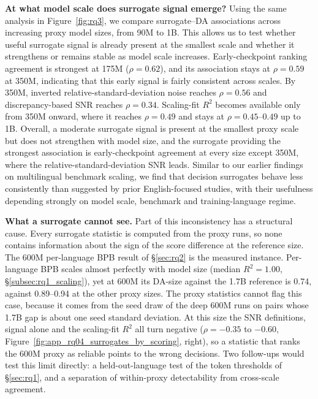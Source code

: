 \textbf{At what model scale does surrogate signal emerge?}
Using the same analysis in Figure~\ref{fig:rq3}, we compare surrogate--DA associations across increasing proxy model sizes, from 90M to 1B.
This allows us to test whether useful surrogate signal is already present at the smallest scale and whether it strengthens or remains stable as model scale increases.
Early-checkpoint ranking agreement is strongest at 175M ($\rho=0.62$), and its association stays at $\rho=0.59$ at 350M, indicating that this early signal is fairly consistent across scales.
By 350M, inverted relative-standard-deviation noise reaches $\rho=0.56$ and discrepancy-based SNR reaches $\rho=0.34$.
Scaling-fit $R^2$ becomes available only from 350M onward, where it reaches $\rho=0.49$ and stays at $\rho = 0.45$--$0.49$ up to 1B.
Overall, a moderate surrogate signal is present at the smallest proxy scale but does not strengthen with model size, and the surrogate providing the strongest association is early-checkpoint agreement at every size except 350M, where the relative-standard-deviation SNR leads.
Similar to our earlier findings on multilingual benchmark scaling, we find that decision surrogates behave less consistently than suggested by prior English-focused studies, with their usefulness depending strongly on model scale, benchmark and training-language regime.

\textbf{What a surrogate cannot see.}
Part of this inconsistency has a structural cause. Every surrogate statistic is computed from the proxy runs, so none contains information about the sign of the score difference at the reference size.
The 600M per-language BPB result of \S\ref{sec:rq2} is the measured instance. Per-language BPB scales almost perfectly with model size (median $R^2 = 1.00$, \S\ref{subsec:rq1_scaling}), yet at 600M its DA-size against the 1.7B reference is 0.74, against 0.89--0.94 at the other proxy sizes.
The proxy statistics cannot flag this case, because it comes from the seed draw of the deep 600M runs on pairs whose 1.7B gap is about one seed standard deviation.
At this size the SNR definitions, signal alone and the scaling-fit $R^2$ all turn negative ($\rho = -0.35$ to $-0.60$, Figure~\ref{fig:app_rq04_surrogates_by_scoring}, right), so a statistic that ranks the 600M proxy as reliable points to the wrong decisions.
Two follow-ups would test this limit directly: a held-out-language test of the token thresholds of \S\ref{sec:rq1}, and a separation of within-proxy detectability from cross-scale agreement.
